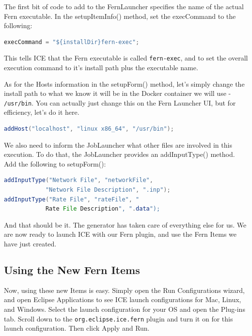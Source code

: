 The first bit of code to add to the FernLauncher specifies the name of the
actual Fern executable. In the setupItemInfo() method, set the execCommand to
the following: 
\begin{lstlisting}[language=Java]
execCommand = "${installDir}fern-exec";
\end{lstlisting}
This tells ICE that the Fern executable is called \texttt{fern-exec}, and to
set the overall execution command to it's install path plus the executable name.

As for the Hosts information in the setupForm() method, let's simply change the
install path to what we know it will be in the Docker container we will use -
\texttt{/usr/bin}.
You can actually just change this on the Fern Launcher UI, but for efficiency, let's
do it here. 
\begin{lstlisting}[language=Java]
addHost("localhost", "linux x86_64", "/usr/bin");
\end{lstlisting}
We also need to inform the JobLauncher what other files are involved in this
execution. To do that, the JobLauncher provides an addInputType() method. Add
the following to setupForm():
\begin{lstlisting}[language=Java]
addInputType("Network File", "networkFile", 
			"Network File Description", ".inp");
addInputType("Rate File", "rateFile", "
			Rate File Description", ".data");
\end{lstlisting}

And that should be it.
The generator has taken care of everything else for us.
We are now ready to launch ICE with our Fern plugin, and use the Fern Items we
have just created.

\subsection*{Using the New Fern Items}
Now, using these new Items is easy. Simply open the Run Configurations wizard,
and open Eclipse Applications to see ICE launch configurations for Mac, Linux,
and Windows. Select the launch configuration for your OS and open the Plug-ins
tab. Scroll down to the \texttt{org.eclipse.ice.fern} plugin and turn it on for
this launch configuration. Then click Apply and Run. 

